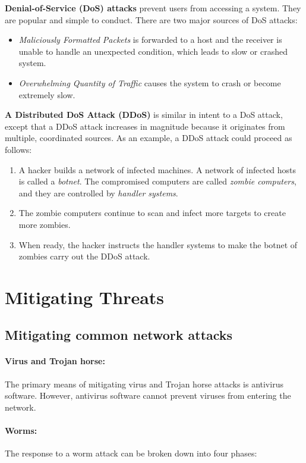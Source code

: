 \textbf{Denial-of-Service (DoS) attacks} prevent users from accessing a system. They are popular and simple to conduct. There are two major sources of DoS attacks:

\begin{itemize}
\item \emph{Maliciously Formatted Packets} is forwarded to a host and the receiver is unable to handle an unexpected condition, which leads to slow or crashed system.
\item \emph{Overwhelming Quantity of Traffic} causes the system to crash or become extremely slow.
\end{itemize}

\textbf{A Distributed DoS Attack (DDoS)} is similar in intent to a DoS attack, except that a DDoS attack increases in magnitude because it originates from multiple, coordinated sources. As an example, a DDoS attack could proceed as follows:

\begin{enumerate}
\item A hacker builds a network of infected machines. A network of infected hosts is called a \emph{botnet}. The compromised computers are called \emph{zombie computers}, and they are controlled by \emph{handler systems}.
\item The zombie computers continue to scan and infect more targets to create more zombies.
\item When ready, the hacker instructs the handler systems to make the botnet of zombies carry out the DDoS attack.
\end{enumerate}

\section{Mitigating Threats}

\subsection{Mitigating common network attacks}

\paragraph{Virus and Trojan horse:} The primary means of mitigating virus and Trojan horse attacks is antivirus software. However, antivirus software cannot prevent viruses from entering the network.

\paragraph{Worms:} The response to a worm attack can be broken down into four phases:


